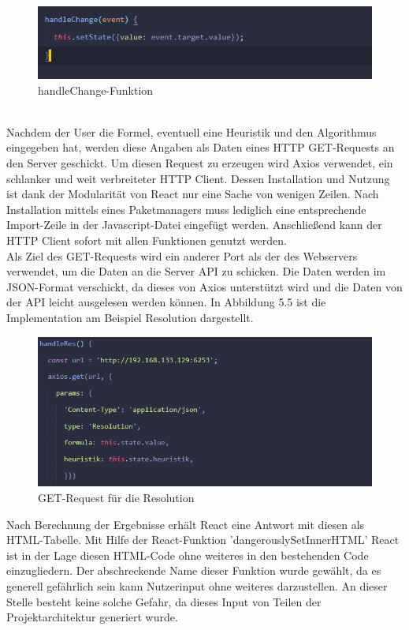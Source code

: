 \begin{figure}[htb]
     \centerline{\includegraphics[width=14cm]{../Abbildungen/handleChange.png}}
  \caption{handleChange-Funktion}
  \label{fig1_1}
\end{figure}\\
Nachdem der User die Formel, eventuell eine Heuristik und den Algorithmus eingegeben hat, werden diese Angaben als Daten eines HTTP GET-Requests an den Server geschickt. Um diesen Request zu erzeugen wird Axios verwendet, ein schlanker und weit verbreiteter HTTP Client.
Dessen Installation und Nutzung ist dank der Modularität von React nur eine Sache von wenigen Zeilen. Nach Installation mittels eines Paketmanagers muss lediglich eine entsprechende Import-Zeile in der Javascript-Datei eingefügt werden. Anschließend kann der HTTP Client sofort mit allen Funktionen genutzt werden. \\
Als Ziel des GET-Requests wird ein anderer Port als der des Webservers verwendet, um die Daten an die Server API zu schicken. Die Daten werden im JSON-Format verschickt, da dieses von Axios unterstützt wird und die Daten von der API leicht ausgelesen werden können. In Abbildung 5.5 ist die Implementation am Beispiel Resolution dargestellt.
\begin{figure}[H]
     \centerline{\includegraphics[width=14cm]{../Abbildungen/axiosResolution.png}}
  \caption{GET-Request für die Resolution}
  \label{fig1_1}
\end{figure}
Nach Berechnung der Ergebnisse erhält React eine Antwort mit diesen als HTML-Tabelle. Mit Hilfe der React-Funktion 'dangerouslySetInnerHTML' React ist in der Lage diesen HTML-Code ohne weiteres in den bestehenden Code einzugliedern. Der abschreckende Name dieser Funktion wurde gewählt, da es generell gefährlich sein kann Nutzerinput ohne weiteres darzustellen. An dieser Stelle besteht keine solche Gefahr, da dieses Input von Teilen der Projektarchitektur generiert wurde.
